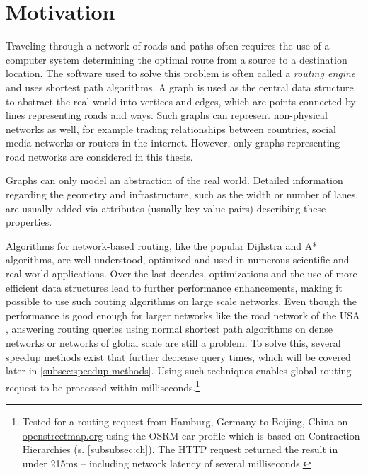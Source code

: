 
\section{Motivation}
	
	Traveling through a network of roads and paths often requires the use of a computer system determining the optimal route from a source to a destination location.
	The software used to solve this problem is often called a \emph{routing engine} and uses shortest path algorithms.
	A graph is used as the central data structure to abstract the real world into vertices and edges, which are points connected by lines representing roads and ways.
	Such graphs can represent non-physical networks as well, for example trading relationships between countries, social media networks or routers in the internet.
	However, only graphs representing road networks are considered in this thesis.
	
	Graphs can only model an abstraction of the real world.
	Detailed information regarding the geometry and infrastructure, such as the width or number of lanes, are usually added via attributes (usually key-value pairs) describing these properties.
	
	Algorithms for network-based routing, like the popular Dijkstra and A* algorithms, are well understood, optimized and used in numerous scientific and real-world applications.
	Over the last decades, optimizations and the use of more efficient data structures lead to further performance enhancements, making it possible to use such routing algorithms on large scale networks.
	Even though the performance is good enough for larger networks like the road network of the USA \cite{aviram-optimizing-dijkstra}, answering routing queries using normal shortest path algorithms on dense networks or networks of global scale are still a problem.
	To solve this, several speedup methods exist that further decrease query times, which will be covered later in \cref{subsec:speedup-methods}.
	Using such techniques enables global routing request to be processed within milliseconds.\footnote{Tested for a routing request from Hamburg, Germany to Beijing, China on \href{https://www.openstreetmap.org/directions?engine=fossgis\_osrm\_car&route=53.55\%2C10.00\%3B39.91\%2C116.39}{openstreetmap.org} using the OSRM car profile which is based on Contraction Hierarchies (s. \cref{subsubsec:ch}). The HTTP request returned the result in under 215ms -- including network latency of several milliseconds.}
	
